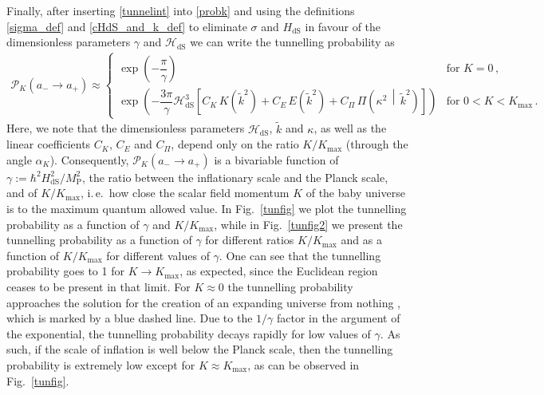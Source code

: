 \documentclass[aps,nofootinbib,prd,superscriptaddress,eqsecnum,showpacs,showkeys,preprintnumbers,altaffilletter]{revtex4}
\newcommand{\MP}{M_\mathrm{P}}
\newcommand{\Kmax}{K_\text{max}}
\newcommand{\HdS}{H_\mathrm{dS}}
\newcommand{\cHdS}{{\mathcal{H}}_{\mathrm{dS}}}
\begin{document}
Finally, after inserting \eqref{tunnelint} into \eqref{probk} and using the definitions \eqref{sigma_def} and \eqref{cHdS_and_k_def} to eliminate $\sigma$ and $\HdS$ in favour of the dimensionless parameters $\gamma$ and $\cHdS$ we can write the tunnelling probability as
\begin{align}
	\mathcal{P}_K(a_-\rightarrow a_+) 
	\approx
	\begin{cases}
	\exp\left(-\dfrac{\pi}{\gamma}\right)
	&
	\text{for } K=0
	\,,
	\\
	 \exp\left(
		-\dfrac{3\pi}{\gamma}\cHdS^3
		\left[
		 C_K\, K\left(\tilde{k}^2\right) 
		 + C_E\, E\left(\tilde{k}^2\right) 
		 + C_\Pi \, \Pi\left(\kappa^2\,\middle|\,\tilde{k}^2\right)
	\right]
	\right)
	&
	\text{for } 0<K<\Kmax
	\,.
	\end{cases}
\end{align}
Here, we note that the dimensionless parameters $\cHdS$, $\tilde{k}$ and $\kappa$, as well as the linear coefficients $C_K$, $C_E$ and $C_\Pi$, depend only on the ratio $K/\Kmax$ (through the angle $\alpha_K$). Consequently, $\mathcal{P}_K(a_-\rightarrow a_+)$ is a bivariable function of  $\gamma:=\hbar^2\HdS^2/\MP^2$, the ratio between the inflationary scale and the Planck scale, and of  $K/\Kmax$, i.\,e.~how close the scalar field momentum $K$ of the baby universe is to the maximum quantum allowed value. In Fig.~\ref{tunfig} we plot the tunnelling probability as a function of $\gamma$ and $K/\Kmax$, while in Fig.~\ref{tunfig2} we present the tunnelling probability  as a function of $\gamma$ for different ratios $K/\Kmax$ and as a function of $K/\Kmax$ for different values of $\gamma$. 
One can see that the tunnelling probability goes to 1 for $K \rightarrow \Kmax$, as expected, since the Euclidean region ceases to be present in that limit. For $K\approx0$ the tunnelling probability approaches the solution for the creation of an expanding universe from nothing \cite{Vilenkin:1984wp}, which is marked by a blue dashed line.
Due to the $1/\gamma$ factor in the argument of the exponential, the tunnelling probability decays rapidly for low values of $\gamma$. As such, if the scale of inflation is well below the Planck scale, then the tunnelling probability is extremely low except for $K\approx\Kmax$, as can be observed in Fig.~\ref{tunfig}.
\end{document}
